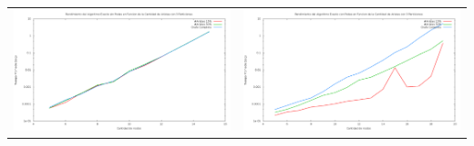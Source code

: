 \bc
\begin{tabular}{l c}
\includegraphics[scale=0.16]{finales/rendimientoExactoSinPoda3Particiones.png}
&
\includegraphics[scale=0.16]{finales/rendimientoExactoConPoda3Particiones.png}
\end{tabular}
\ec

